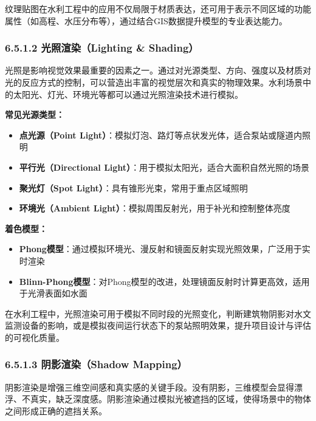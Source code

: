 纹理贴图在水利工程中的应用不仅局限于材质表达，还可用于表示不同区域的功能属性（如高程、水压分布等），通过结合GIS数据提升模型的专业表达能力。

\subsubsection{6.5.1.2 光照渲染（Lighting \&
Shading）}\label{ux5149ux7167ux6e32ux67d3lighting-shading}

光照是影响视觉效果最重要的因素之一。通过对光源类型、方向、强度以及材质对光的反应方式的控制，可以营造出丰富的视觉层次和真实的物理效果。水利场景中的太阳光、灯光、环境光等都可以通过光照渲染技术进行模拟。

\textbf{常见光源类型：}

\begin{itemize}
\tightlist
\item
  \textbf{点光源（Point
  Light）}：模拟灯泡、路灯等点状发光体，适合泵站或隧道内照明
\item
  \textbf{平行光（Directional
  Light）}：用于模拟太阳光，适合大面积自然光照的场景
\item
  \textbf{聚光灯（Spot Light）}：具有锥形光束，常用于重点区域照明
\item
  \textbf{环境光（Ambient
  Light）}：模拟周围反射光，用于补光和控制整体亮度
\end{itemize}

\textbf{着色模型：}

\begin{itemize}
\tightlist
\item
  \textbf{Phong模型}：通过模拟环境光、漫反射和镜面反射实现光照效果，广泛用于实时渲染
\item
  \textbf{Blinn-Phong模型}：对Phong模型的改进，处理镜面反射时计算更高效，适用于光滑表面如水面
\end{itemize}

在水利工程中，光照渲染可用于模拟不同时段的光照变化，判断建筑物阴影对水文监测设备的影响，或是模拟夜间运行状态下的泵站照明效果，提升项目设计与评估的可视化质量。

\subsubsection{6.5.1.3 阴影渲染（Shadow
Mapping）}\label{ux9634ux5f71ux6e32ux67d3shadow-mapping}

阴影渲染是增强三维空间感和真实感的关键手段。没有阴影，三维模型会显得漂浮、不真实，缺乏深度感。阴影渲染通过模拟光被遮挡的区域，使得场景中的物体之间形成正确的遮挡关系。

